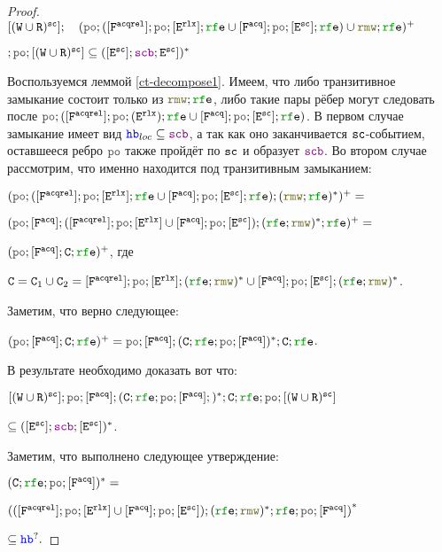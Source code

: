 \documentclass[14pt]{matmex-diploma-custom}
\newcommand{\Fa}{\lF^{\acq}}
\newcommand{\Far}{\lF^{\acqrel}}
\begin{document}
\begin{proof}
  $[(\lW \cup \lR)^{\sco}] ; \quad (\lPO ; ([\Far] ; \lPO ; [\lE^{\rlx}] ; \lRFE \cup [\Fa] ; \lPO ; [\lE^{\sco}] ; \lRFE) \cup \lRMW ; \lRFE)^{+}$
  
  $; \lPO ; [(\lW \cup \lR)^{\sco}] \subseteq  ([\lE^{\sco}] ; \lSCB ;\lE^{\sco}])^{*}$

  Воспользуемся леммой \ref{ct-decompose1}. Имеем, что либо транзитивное замыкание состоит только из $\lRMW ; \lRFE$, либо такие пары рёбер могут следовать после $\lPO ; ([\Far] ; \lPO ; (\lE^{\rlx}) ; \lRFE \cup [\Fa] ; \lPO ; [\lE^{\sco}] ; \lRFE)$. В первом случае замыкание имеет вид $\lHB_{loc} \subseteq \lSCB$, а так как оно заканчивается ${\mathtt{sc}}$-событием, оставшееся ребро $\lPO$ также пройдёт по ${\mathtt{sc}}$ и образует $\lSCB$. Во втором случае рассмотрим, что именно находится под транзитивным замыканием:

  \newcommand{\CA}{\mathtt{C}}

  $(\lPO ; ([\Far] ; \lPO ; [\lE^{\rlx}] ; \lRFE \cup [\Fa] ; \lPO ; [\lE^{\sco}] ; \lRFE) ; (\lRMW ; \lRFE)^{*})^{+} =$

  $(\lPO ; [\Fa] ;([\Far] ; \lPO ; [\lE^{\rlx}] \cup [\Fa] ; \lPO ; [\lE^{\sco}]) ; (\lRFE ; \lRMW)^{*}; \lRFE)^{+} = $

  $(\lPO ; [\Fa]; \CA; \lRFE)^{+}$, где 

  $\CA=\CA_1 \cup \CA_2 = [\Far] ; \lPO ; [\lE^{\rlx}] ; (\lRFE ; \lRMW)^{*} \cup [\Fa] ; \lPO ; [\lE^{\sco}] ; (\lRFE ; \lRMW)^{*}$.

  \newcommand{\canceloffset}{\hspace{-0.78cm}}
  \canceloffset Заметим, что верно следующее: 
  
  $(\lPO ; [\Fa]; \CA; \lRFE)^{+}=\lPO ; [\Fa]; (\CA; \lRFE; \lPO ; [\Fa])^{*}; \CA; \lRFE$.

  \canceloffset В результате необходимо доказать вот что: 

  $[(\lW \cup \lR)^{\sco}] ; \lPO ; [\Fa]; (\CA; \lRFE; \lPO ; [\Fa];)^{*}; \CA; \lRFE; \lPO ; [(\lW \cup \lR)^{\sco}] $

  $\subseteq  ([\lE^{\sco}] ; \lSCB ; [\lE^{\sco}])^{*}$. 

  \canceloffset Заметим, что выполнено следующее утверждение:

  $(\CA; \lRFE; \lPO ; [\Fa])^{*} = $

  $\left(([\Far] ; \lPO ; [\lE^{\rlx}] \cup [\Fa] ; \lPO ; [\lE^{\sco}]) ; (\lRFE ; \lRMW)^{*}; \lRFE; \lPO ; [\Fa] \right)^{*} $

  $\subseteq \lHB^?.$
  

\end{proof}
\end{document}
